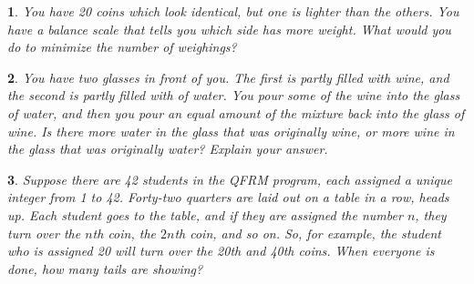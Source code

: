 \documentclass{report}
\newtheorem{problem}{}
\numberwithin{problem}{chapter} %
\begin{document}
\begin{problem}
You have 20 coins which look identical, but one is lighter than the others. You have a balance scale that tells you which side has more weight. What would you do to minimize the number of weighings?
\end{problem}

\begin{problem}
You have two glasses in front of you. The first is partly filled with wine, and the second is partly filled with of water. You pour some of the wine into the glass of water, and then you pour an equal amount of the mixture back into the glass of wine. Is there more water in the glass that was originally wine, or more wine in the glass that was originally water? Explain your answer.
\end{problem}

\begin{problem}
Suppose there are 42 students in the QFRM program, each assigned a unique integer from 1 to 42. Forty-two quarters are laid out on a table in a row, heads up. Each student goes to the table, and if they are assigned the number $n$, they turn over the $n$th coin, the $2n$th coin, and so on. So, for example, the student who is assigned 20 will turn over the 20th and 40th coins. When everyone is done, how many tails are showing?
\end{problem}



\printbibliography
\end{document}
